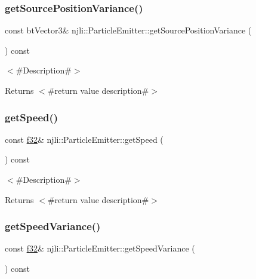 \subsubsection{\texorpdfstring{get\+Source\+Position\+Variance()}{getSourcePositionVariance()}}
{\footnotesize\ttfamily const bt\+Vector3\& njli\+::\+Particle\+Emitter\+::get\+Source\+Position\+Variance (\begin{DoxyParamCaption}{ }\end{DoxyParamCaption}) const}

$<$\#\+Description\#$>$

\begin{DoxyReturn}{Returns}
$<$\#return value description\#$>$ 
\end{DoxyReturn}
\mbox{\label{classnjli_1_1_particle_emitter_a4f0ebb77d698250e0c939e7fc5f17661}} 
\subsubsection{\texorpdfstring{get\+Speed()}{getSpeed()}}
{\footnotesize\ttfamily const \mbox{\hyperlink{_util_8h_a5f6906312a689f27d70e9d086649d3fd}{f32}}\& njli\+::\+Particle\+Emitter\+::get\+Speed (\begin{DoxyParamCaption}{ }\end{DoxyParamCaption}) const}

$<$\#\+Description\#$>$

\begin{DoxyReturn}{Returns}
$<$\#return value description\#$>$ 
\end{DoxyReturn}
\mbox{\label{classnjli_1_1_particle_emitter_a848e021fa1cae817cb1d1270453e0799}} 
\subsubsection{\texorpdfstring{get\+Speed\+Variance()}{getSpeedVariance()}}
{\footnotesize\ttfamily const \mbox{\hyperlink{_util_8h_a5f6906312a689f27d70e9d086649d3fd}{f32}}\& njli\+::\+Particle\+Emitter\+::get\+Speed\+Variance (\begin{DoxyParamCaption}{ }\end{DoxyParamCaption}) const}

